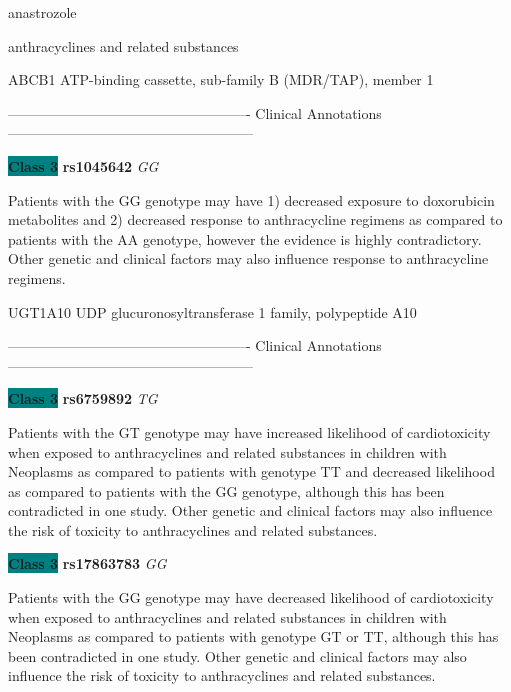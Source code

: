 \documentclass{resume} %
\begin{document}
\begin{rSection}{ anastrozole }
\end{rSection}\begin{rSection}{ anthracyclines and related substances }
\item[]

\begin{rSubsection}{ ABCB1 }{ ATP-binding cassette, sub-family B (MDR/TAP), member 1 }{}{}
\item[]

\item[] ---------------------------------------------------- Clinical Annotations -----------------------------------------------------\newline
\item \textbf{\colorbox{teal} {Class 3}} \textbf{ rs1045642 } \textit{ GG }
\item[] Patients with the GG genotype may have 1) decreased exposure to doxorubicin metabolites and 2) decreased response to anthracycline regimens as compared to patients with the AA genotype, however the evidence is highly contradictory. Other genetic and clinical factors may also influence response to anthracycline regimens.
\end{rSubsection}\begin{rSubsection}{ UGT1A10 }{ UDP glucuronosyltransferase 1 family, polypeptide A10 }{}{}
\item[]

\item[] ---------------------------------------------------- Clinical Annotations -----------------------------------------------------\newline
\item \textbf{\colorbox{teal} {Class 3}} \textbf{ rs6759892 } \textit{ TG }
\item[] Patients with the GT genotype may have increased likelihood of cardiotoxicity when exposed to anthracyclines and related substances in children with Neoplasms as compared to patients with genotype TT and decreased likelihood as compared to patients with the GG genotype, although this has been contradicted in one study. Other genetic and clinical factors may also influence the risk of toxicity to anthracyclines and related substances. \item \textbf{\colorbox{teal} {Class 3}} \textbf{ rs17863783 } \textit{ GG }
\item[] Patients with the GG genotype may have decreased likelihood of cardiotoxicity when exposed to anthracyclines and related substances in children with Neoplasms as compared to patients with genotype GT or TT, although this has been contradicted in one study. Other genetic and clinical factors may also influence the risk of toxicity to anthracyclines and related substances.


\end{rSubsection}
\end{rSection}
\end{document}
